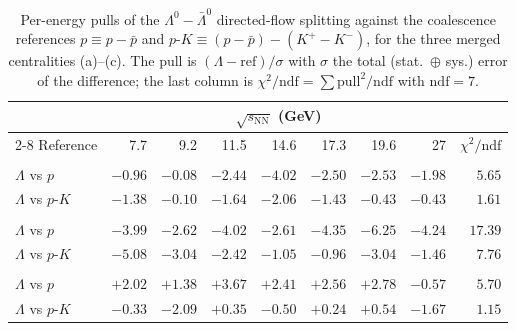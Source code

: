 \begin{table}[htbp]
  \centering
  \caption{Per-energy pulls of the $\Lambda^{0}-\bar{\Lambda}^{0}$ directed-flow splitting against the coalescence references $p\equiv p-\bar{p}$ and $p\text{-}K\equiv(p-\bar{p})-(K^{+}-K^{-})$, for the three merged centralities (a)--(c). The pull is $(\Lambda-\mathrm{ref})/\sigma$ with $\sigma$ the total (stat.\ $\oplus$ sys.) error of the difference; the last column is $\chi^{2}/\mathrm{ndf}=\sum\mathrm{pull}^{2}/\mathrm{ndf}$ with $\mathrm{ndf}=7$.}
  \label{tab:fig3_pulls}
  \begin{ruledtabular}
  \begin{tabular}{l rrrrrrr r}
    & \multicolumn{7}{c}{$\sqrt{s_{\mathrm{NN}}}$ (GeV)} & \\
    \cline{2-8}
    Reference & 7.7 & 9.2 & 11.5 & 14.6 & 17.3 & 19.6 & 27 & $\chi^{2}/\mathrm{ndf}$ \\
    \colrule
    \multicolumn{9}{l}{\textbf{(a) $0$--$10\%$}} \\
    $\Lambda$ vs $p$ & $-0.96$ & $-0.08$ & $-2.44$ & $-4.02$ & $-2.50$ & $-2.53$ & $-1.98$ & $5.65$ \\
    $\Lambda$ vs $p\text{-}K$ & $-1.38$ & $-0.10$ & $-1.64$ & $-2.06$ & $-1.43$ & $-0.43$ & $-0.43$ & $1.61$ \\
    \colrule
    \multicolumn{9}{l}{\textbf{(b) $10$--$40\%$}} \\
    $\Lambda$ vs $p$ & $-3.99$ & $-2.62$ & $-4.02$ & $-2.61$ & $-4.35$ & $-6.25$ & $-4.24$ & $17.39$ \\
    $\Lambda$ vs $p\text{-}K$ & $-5.08$ & $-3.04$ & $-2.42$ & $-1.05$ & $-0.96$ & $-3.04$ & $-1.46$ & $7.76$ \\
    \colrule
    \multicolumn{9}{l}{\textbf{(c) $40$--$80\%$}} \\
    $\Lambda$ vs $p$ & $+2.02$ & $+1.38$ & $+3.67$ & $+2.41$ & $+2.56$ & $+2.78$ & $-0.57$ & $5.70$ \\
    $\Lambda$ vs $p\text{-}K$ & $-0.33$ & $-2.09$ & $+0.35$ & $-0.50$ & $+0.24$ & $+0.54$ & $-1.67$ & $1.15$ \\
  \end{tabular}
  \end{ruledtabular}
\end{table}
